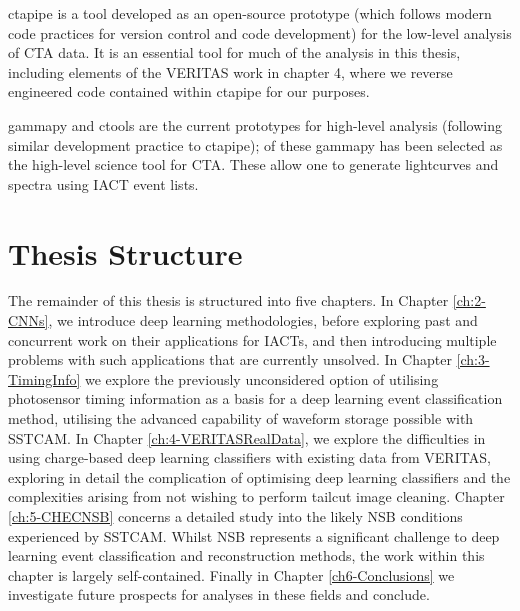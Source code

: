 ctapipe is a tool developed as an open-source prototype (which follows modern code practices for version control and code development) for the low-level analysis of CTA data. It is an essential tool for much of the analysis in this thesis, including elements of the VERITAS work in chapter 4, where we reverse engineered code contained within ctapipe for our purposes.

gammapy and ctools are the current prototypes for high-level analysis (following similar development practice to ctapipe); of these gammapy has been selected as the high-level science tool for CTA. These allow one to generate lightcurves and spectra using IACT event lists. 

\section{Thesis Structure}
The remainder of this thesis is structured into five chapters. In Chapter \ref{ch:2-CNNs}, we introduce deep learning methodologies, before exploring past and concurrent work on their applications for IACTs, and then introducing multiple problems with such applications that are currently unsolved. In Chapter \ref{ch:3-TimingInfo} we explore the previously unconsidered option of utilising photosensor timing information as a basis for a deep learning event classification method, utilising the advanced capability of waveform storage possible with SSTCAM. In Chapter \ref{ch:4-VERITASRealData}, we explore the difficulties in using charge-based deep learning classifiers with existing data from VERITAS, exploring in detail the complication of optimising deep learning classifiers and the complexities arising from not wishing to perform tailcut image cleaning. Chapter \ref{ch:5-CHECNSB} concerns a detailed study into the likely NSB conditions experienced by SSTCAM. Whilst NSB represents a significant challenge to deep learning event classification and reconstruction methods, the work within this chapter is largely self-contained. Finally in Chapter \ref{ch6-Conclusions} we investigate future prospects for analyses in these fields and conclude.